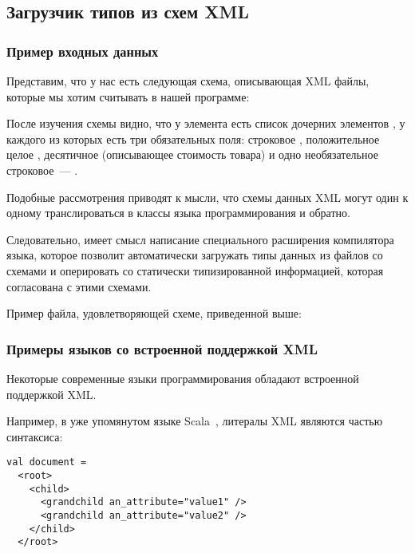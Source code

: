 \clearpage
\subsection{Загрузчик типов из схем XML}\label{xml-loader}


\begin{code}
\subsubsection{Пример входных данных}
Представим, что у нас есть следующая схема, описывающая XML файлы, которые мы хотим считывать в нашей программе:

\end{code}

После изучения схемы видно, что у элемента  есть список дочерних элементов , у каждого из которых есть три обязательных поля: строковое , положительное целое , десятичное  (описывающее стоимость товара) и одно необязательное строковое~--- .

Подобные рассмотрения приводят к мысли, что схемы данных XML могут один к одному транслироваться в классы языка программирования и обратно.

Следовательно, имеет смысл написание специального расширения компилятора языка, которое позволит автоматически загружать типы данных из файлов со схемами и оперировать со статически типизированной информацией, которая согласована с этими схемами.

\begin{code}
Пример файла, удовлетворяющей схеме, приведенной выше:

\end{code}

\subsubsection{Примеры языков со встроенной поддержкой XML}
Некоторые современные языки программирования обладают встроенной поддержкой XML.

Например, в уже упомянутом языке Scala~\cite{scala-spec}, литералы XML являются частью синтаксиса:

\begin{code}\begin{lstlisting}[caption={Пример использования литералов XML в языке Scala.}, label=scala-xml-example]
val document =
  <root>
    <child>
      <grandchild an_attribute="value1" />
      <grandchild an_attribute="value2" />
    </child>
  </root>
\end{lstlisting}\end{code}

